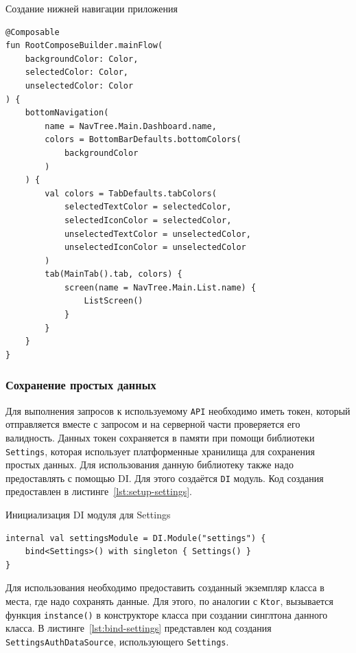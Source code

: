 \documentclass[14pt, russian]{scrartcl}
\begin{document}
\begin{listing}[!htb]
\caption{Создание нижней навигации приложения}
\label{lst:odyssey-bottom-nav}
\begin{verbatim}
@Composable
fun RootComposeBuilder.mainFlow(
    backgroundColor: Color,
    selectedColor: Color,
    unselectedColor: Color
) {
    bottomNavigation(
        name = NavTree.Main.Dashboard.name,
        colors = BottomBarDefaults.bottomColors(
            backgroundColor
        )
    ) {
        val colors = TabDefaults.tabColors(
            selectedTextColor = selectedColor,
            selectedIconColor = selectedColor,
            unselectedTextColor = unselectedColor,
            unselectedIconColor = unselectedColor
        )
        tab(MainTab().tab, colors) {
            screen(name = NavTree.Main.List.name) {
                ListScreen()
            }
        }
    }
}
\end{verbatim}
\end{listing}
\subsubsection{Сохранение простых данных}\label{sect:other-libs}

Для выполнения запросов к используемому \texttt{API} необходимо иметь токен, который отправляется вместе с запросом и на серверной части проверяется его валидность. Данных токен сохраняется в памяти при помощи библиотеки \texttt{Settings}, которая использует платформенные хранилища для сохранения простых данных. Для использования данную библиотеку также надо предоставлять с помощью DI. Для этого создаётся \texttt{DI} модуль. Код создания предоставлен в листинге~\ref{lst:setup-settings}.

\begin{listing}[!htb]
\caption{Инициализация DI модуля для Settings}
\label{lst:setup-settings}
\begin{verbatim}
internal val settingsModule = DI.Module("settings") {
    bind<Settings>() with singleton { Settings() }
}
\end{verbatim}
\end{listing}

Для использования необходимо предоставить созданный экземпляр класса в места, где надо сохранять данные. Для этого, по аналогии с \texttt{Ktor}, вызывается функция \texttt{instance()} в конструкторе класса при создании синглтона данного класса. В листинге~\ref{lst:bind-settings} представлен код создания \texttt{SettingsAuthDataSource}, использующего \texttt{Settings}.
\end{document}
